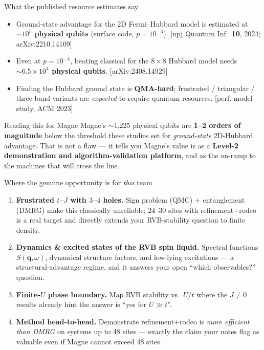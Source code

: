 \documentclass[aspectratio=169,11pt]{beamer}
\begin{document}
\begin{frame}{What the published resource estimates say}
\begin{itemize}
  \item Ground-state advantage for the 2D Fermi--Hubbard model is estimated at
        \textbf{$\sim 10^{5}$ physical qubits} (surface code, $p=10^{-3}$).
        \hfill {\scriptsize[npj Quantum Inf.\ \textbf{10}, 2024; arXiv:2210.14109]}
  \item Even at $p=10^{-4}$, beating classical for the $8\times8$ Hubbard model needs
        \textbf{$\sim 6.5\times10^{4}$ physical qubits}.
        \hfill {\scriptsize[arXiv:2408.14929]}
  \item Finding the Hubbard ground state is \textbf{QMA-hard}; frustrated / triangular /
        three-band variants are \emph{expected} to require quantum resources.
        \hfill {\scriptsize[perf.-model study, ACM 2023]}
\end{itemize}
\begin{block}{Reading this for Magne}
Magne's $\sim$1{,}225 physical qubits are \textbf{1--2 orders of magnitude} below the
threshold these studies set for \emph{ground-state} 2D-Hubbard advantage. That is not
a flaw --- it tells you Magne's value is as a \textbf{Level-2 demonstration and
algorithm-validation platform}, and as the on-ramp to the machines that will cross the line.
\end{block}
\end{frame}

\begin{frame}{Where the genuine opportunity is for \emph{this} team}
\begin{enumerate}
  \item \textbf{Frustrated $t$--$J$ with $3$--$4$ holes.} Sign problem (QMC) $+$ entanglement
        (DMRG) make this classically unreliable; $24$--$30$ sites with refinement$+$rodeo
        is a real target and directly extends your RVB-stability question to finite density.
  \item \textbf{Dynamics \& excited states of the RVB spin liquid.} Spectral functions
        $S(\mathbf{q},\omega)$, dynamical structure factors, and low-lying excitations ---
        a structural-advantage regime, and it answers your open ``which observables?'' question.
  \item \textbf{Finite-$U$ phase boundary.} Map RVB stability vs.\ $U/t$ where the
        $J\neq0$ results already hint the answer is ``yes for $U\gg t$''.
  \item \textbf{Method head-to-head.} Demonstrate refinement$+$rodeo is \emph{more efficient
        than DMRG} on systems up to 48 sites --- exactly the claim your notes flag as valuable
        even if Magne cannot exceed 48 sites.
\end{enumerate}
\end{frame}
\end{document}
